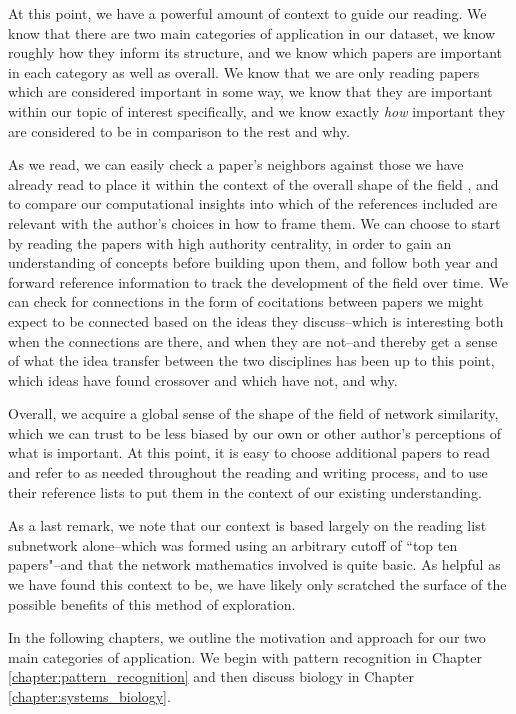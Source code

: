 \documentclass[12pt]{thesis}
\theoremstyle{plain}
\theoremstyle{definition}
\theoremstyle{remark}
\begin{document}
At this point, we have a powerful amount of context to guide our reading. We know that there are two main categories of application in our dataset, we know roughly how they inform its structure, and we know which papers are important in each category as well as overall. We know that we are only reading papers which are considered important in some way, we know that they are important within our topic of interest specifically, and we know exactly \textit{how} important they are considered to be in comparison to the rest and why. 

As we read, we can easily check a paper's neighbors against those we have already read to place it within the context of the overall shape of the field , and to compare our computational insights into which of the references included are relevant with the author's choices in how to frame them. We can choose to start by reading the papers with high authority centrality, in order to gain an understanding of concepts before building upon them, and follow both year and forward reference information to track the development of the field over time. We can check for connections in the form of cocitations between papers we might expect to be connected based on the ideas they discuss--which is interesting both when the connections are there, and when they are not--and thereby get a sense of what the idea transfer between the two disciplines has been up to this point, which ideas have found crossover and which have not, and why. 

Overall, we acquire a global sense of the shape of the field of network similarity, which we can trust to be less biased by our own or other author's perceptions of what is important. At this point, it is easy to choose additional papers to read and refer to as needed throughout the reading and writing process, and to use their reference lists to put them in the context of our existing understanding.

As a last remark, we note that our context is based largely on the reading list subnetwork alone--which was formed using an arbitrary cutoff of ``top ten papers"--and that the network mathematics involved is quite basic. As helpful as we have found this context to be, we have likely only scratched the surface of the possible benefits of this method of exploration.

In the following chapters, we outline the motivation and approach for our two main categories of application. We begin with pattern recognition in Chapter \ref{chapter:pattern_recognition} and then discuss biology in Chapter \ref{chapter:systems_biology}.
\end{document}
